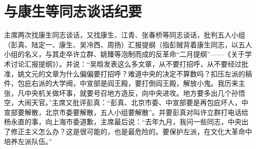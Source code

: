 \section[与康生等同志谈话纪要（一九六六年三月二十八日至三十日）]{与康生等同志谈话纪要}


主席两次找康生同志谈话，又找康生、江青、张春桥等同志谈话，批判五人小组（彭真、陆定一、康生、吴冷西、周扬）汇报提纲（指彭贼背着康生同志，以五人小组的名义，与其走卒许立群、姚臻等泡制而成的反革命“二月提纲”——《关于学术讨论汇报提纲》）。并说：“吴晗发表这么多文章，从不要打招呼，从不要经过批准，姚文元的文章为什么偏偏要打招呼？难道中央的决定不算数吗？扣压左派的稿件，包庇右派的大学阀，中宣部是阎王殿，要打倒阎王殿，解放小鬼。我历来主张，凡中央机关做坏事，就要号召地方造反，向中央进攻。地方要多出几个孙悟空，大闹天官。”主席又批评彭真：“彭真、北京市委、中宣部要是再包庇坏人，中宣部要解散，北京市委要解散，五人小组要解散”。并要彭真对叫许立群打电话给杨永直的事，向上海市委道歉，主席最后说：“去年九月，我问一些同志，中央出了修正主义怎么办？这是很可能的，也是最危险的。要保护左派，在文化大革命中培养左派队伍。”

